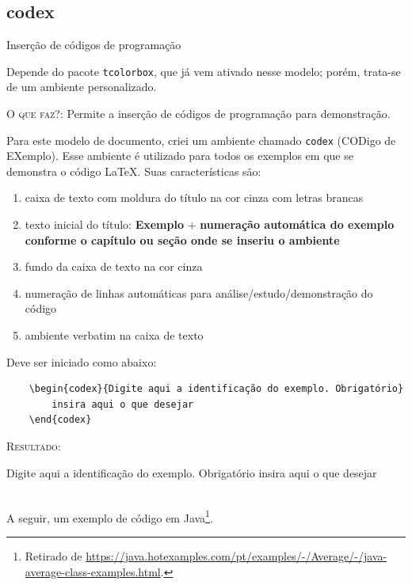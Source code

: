 \subsection{codex}{Inserção de códigos de programação}

Depende do pacote \verb|tcolorbox|, que já vem ativado nesse modelo; porém, trata-se de um ambiente personalizado.

\textsc{O que faz?}: Permite a inserção de códigos de programação para demonstração.

Para este modelo de documento, criei um ambiente chamado \verb|codex| (CODigo de EXemplo). Esse ambiente é utilizado para todos os exemplos em que se demonstra o código \LaTeX. Suas características são:

\begin{enumerate}
	\item caixa de texto com moldura do título na cor cinza com letras brancas
	\item texto inicial do título: \textbf{Exemplo} + \textbf{numeração automática do exemplo conforme o capítulo ou seção onde se inseriu o ambiente}
	\item fundo da caixa de texto na cor cinza
	\item numeração de linhas automáticas para análise/estudo/demonstração do código
	\item ambiente verbatim na caixa de texto
\end{enumerate} 

Deve ser iniciado como abaixo:

\begin{verbatim}
	\begin{codex}{Digite aqui a identificação do exemplo. Obrigatório}
		insira aqui o que desejar
	\end{codex}
\end{verbatim}

\textsc{Resultado:}
\ \\

\begin{codex}{Digite aqui a identificação do exemplo. Obrigatório}
	insira aqui o que desejar
\end{codex}
\ \\

A seguir, um exemplo de código em Java\footnote{Retirado de \url{https://java.hotexamples.com/pt/examples/-/Average/-/java-average-class-examples.html}.}.

